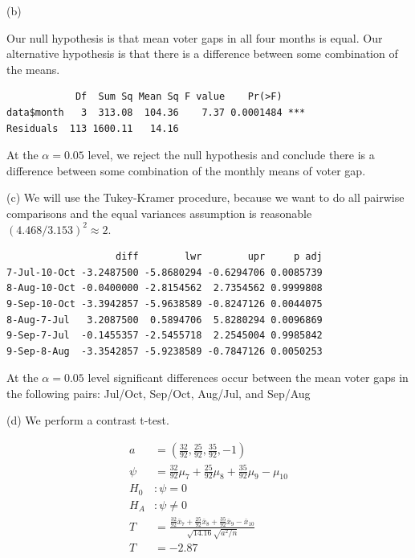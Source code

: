 \documentclass[11pt]{article}
\begin{document}
\vspace{0.1in}

\noindent (b)

Our null hypothesis is that mean voter gaps in all four months is equal.  Our alternative hypothesis is that there is a difference between some combination of the means.

\begin{verbatim}
            Df  Sum Sq Mean Sq F value    Pr(>F)
data$month   3  313.08  104.36    7.37 0.0001484 ***
Residuals  113 1600.11   14.16
\end{verbatim}

At the $\alpha = 0.05$ level, we reject the null hypothesis and conclude there is a difference between some combination of the monthly means of voter gap.

\pagebreak

\noindent (c) We will use the Tukey-Kramer procedure, because we want to do all pairwise comparisons and the equal variances assumption is reasonable $(4.468/3.153)^2 \approx 2$.

\begin{verbatim}
                   diff        lwr        upr     p adj
7-Jul-10-Oct -3.2487500 -5.8680294 -0.6294706 0.0085739
8-Aug-10-Oct -0.0400000 -2.8154562  2.7354562 0.9999808
9-Sep-10-Oct -3.3942857 -5.9638589 -0.8247126 0.0044075
8-Aug-7-Jul   3.2087500  0.5894706  5.8280294 0.0096869
9-Sep-7-Jul  -0.1455357 -2.5455718  2.2545004 0.9985842
9-Sep-8-Aug  -3.3542857 -5.9238589 -0.7847126 0.0050253
\end{verbatim}

At the $\alpha = 0.05$ level significant differences occur between the mean voter gaps in the following pairs: Jul/Oct, Sep/Oct, Aug/Jul, and Sep/Aug

\vspace{0.1in}

\noindent (d) We perform a contrast t-test.

\begin{align*}
a &= (\frac{32}{92}, \frac{25}{92}, \frac{35}{92}, -1)\\
\psi &= \frac{32}{92}\mu_7 + \frac{25}{92}\mu_8 + \frac{35}{92}\mu_9 - \mu_{10}\\
H_0&: \psi = 0\\
H_A&: \psi \ne 0\\
T &= \frac{\frac{32}{92}\bar{x}_7 + \frac{25}{92}\bar{x}_8 + \frac{35}{92}\bar{x}_9 - \bar{x}_{10}}{\sqrt{14.16}\sqrt{a^2/n}}\\
T &= -2.87
\end{align*}
\end{document}
